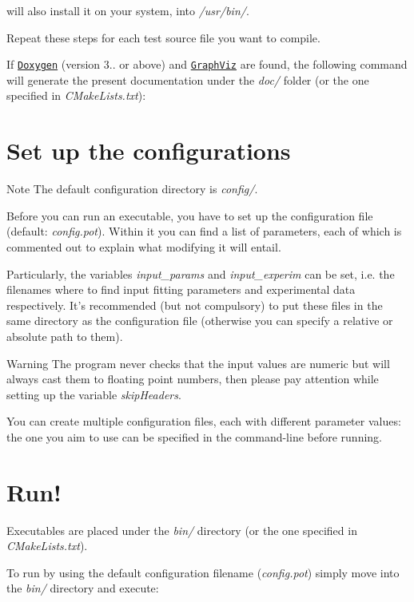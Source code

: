 will also install it on your system, into {\itshape /usr/bin/}.

Repeat these steps for each test source file you want to compile.

If \href{http://www.doxygen.org}{\tt Doxygen} (version 3.. or above) and \href{http://www.graphviz.org}{\tt Graph\-Viz} are found, the following command will generate the present documentation under the {\itshape doc/} folder (or the one specified in {\itshape C\-Make\-Lists.\-txt})\-:


\hypertarget{index_configure}{}\section{Set up the configurations}\label{index_configure}
\begin{DoxyNote}{Note}
The default configuration directory is {\itshape config/}.
\end{DoxyNote}
Before you can run an executable, you have to set up the configuration file (default\-: {\itshape config.\-pot}). Within it you can find a list of parameters, each of which is commented out to explain what modifying it will entail. \par
Particularly, the variables {\itshape input\-\_\-params} and {\itshape input\-\_\-experim} can be set, i.\-e. the filenames where to find input fitting parameters and experimental data respectively. It's recommended (but not compulsory) to put these files in the same directory as the configuration file (otherwise you can specify a relative or absolute path to them).

\begin{DoxyWarning}{Warning}
The program never checks that the input values are numeric but will always cast them to floating point numbers, then please pay attention while setting up the variable {\itshape skip\-Headers}.
\end{DoxyWarning}
You can create multiple configuration files, each with different parameter values\-: the one you aim to use can be specified in the command-\/line before running.\hypertarget{index_run}{}\section{Run!}\label{index_run}
Executables are placed under the {\itshape bin/} directory (or the one specified in {\itshape C\-Make\-Lists.\-txt}). \par
\par
To run by using the default configuration filename ({\itshape config.\-pot}) simply move into the {\itshape bin/} directory and execute\-:


